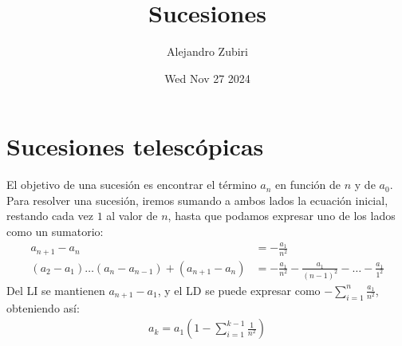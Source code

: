 \documentclass{article}
\author{Alejandro Zubiri}
\date{Wed Nov 27 2024}
\title{Sucesiones}
\begin{document}
\maketitle
\tableofcontents
\pagebreak

\section{Sucesiones telescópicas}
El objetivo de una sucesión es encontrar el término $a_{n}$ en función de $n$ y de $a_{0}$.
Para resolver una sucesión, iremos sumando a ambos lados la ecuación inicial, restando
cada vez $1$ al valor de $n$, hasta que podamos expresar uno de los lados como un sumatorio:
\begin{equation}
    \begin{split}
        a_{n+1} - a_{n} &=  - \frac{a_{1}}{n^{2}}\\
        (a_{2}-a_{1}) \dots(a_{n}- a_{n-1})+(a_{n+1}-a_{n})&= -\frac{a_{1}}{n^{2}}-\frac{a_{1}}{(n-1)^{2}}
        - \dots - \frac{a_{1}}{1^{2}}
    \end{split}
\end{equation}
Del LI se mantienen $a_{n+1}-a_{1}$, y el LD se puede expresar como
$-\sum _{i=1}^n \frac{a_{1}}{n^{2}}$, obteniendo así:
\begin{equation}
    \begin{split}
        a_{k} = a_{1}(1-\sum _{i=1}^{k-1} \frac{1}{n^{2}})
    \end{split}
\end{equation}
\end{document}
